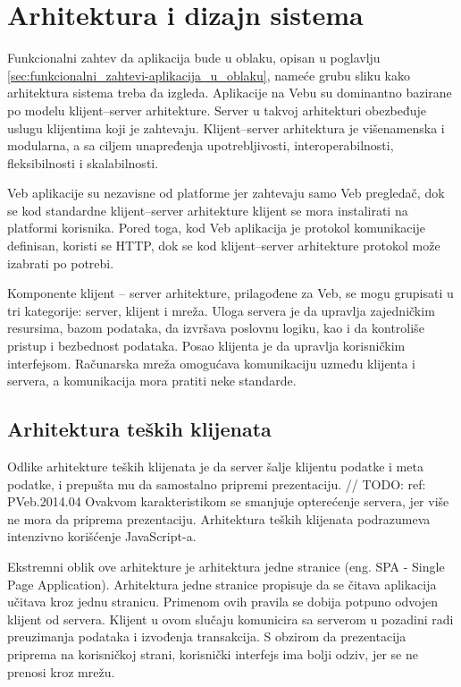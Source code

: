 \chapter{Arhitektura i dizajn sistema}\label{ch:arhitektura}

Funkcionalni zahtev da aplikacija bude u oblaku, opisan u poglavlju 
\ref{sec:funkcionalni_zahtevi-aplikacija_u_oblaku}, nameće grubu sliku kako arhitektura sistema 
treba da izgleda. Aplikacije na Vebu su dominantno bazirane po modelu klijent--server arhitekture. 
Server u takvoj arhitekturi obezbeđuje uslugu klijentima koji je zahtevaju. Klijent--server 
arhitektura je višenamenska i modularna, a sa ciljem unapređenja upotrebljivosti, interoperabilnosti, 
fleksibilnosti i skalabilnosti. 

Veb aplikacije su nezavisne od platforme jer zahtevaju samo Veb pregledač, dok se kod standardne 
klijent--server arhitekture klijent se mora instalirati na platformi korisnika. Pored toga, 
kod Veb aplikacija je protokol komunikacije definisan, koristi se HTTP, dok se kod klijent--server
arhitekture protokol može izabrati po potrebi.

Komponente klijent -- server arhitekture, prilagođene za Veb, se mogu grupisati u tri kategorije: 
server, klijent i mreža. Uloga servera je da upravlja zajedničkim resursima, bazom podataka, da 
izvršava poslovnu logiku, kao i da kontroliše pristup i bezbednost podataka. Posao klijenta je da 
upravlja korisničkim interfejsom. Računarska mreža omogućava komunikaciju uzmeđu klijenta i servera, 
a komunikacija mora pratiti neke standarde.

\section{Arhitektura teških klijenata}\label{sec:arhitektura-spa}
Odlike arhitekture teških klijenata je da server šalje klijentu podatke i meta podatke, i prepušta 
mu da samostalno pripremi prezentaciju. // TODO: ref: PVeb.2014.04%
Ovakvom karakteristikom se smanjuje opterećenje servera, jer više ne mora da priprema prezentaciju.
Arhitektura teških klijenata podrazumeva intenzivno korišćenje JavaScript-a.

Ekstremni oblik ove arhitekture je arhitektura jedne stranice (eng. SPA - Single Page Application).
Arhitektura jedne stranice propisuje da se čitava aplikacija učitava kroz jednu stranicu. Primenom 
ovih pravila se dobija potpuno odvojen klijent od servera. Klijent u ovom slučaju komunicira 
sa serverom u pozadini radi preuzimanja podataka i izvođenja transakcija. S obzirom da prezentacija
priprema na korisničkoj strani, korisnički interfejs ima bolji odziv, jer se ne prenosi kroz mrežu.

